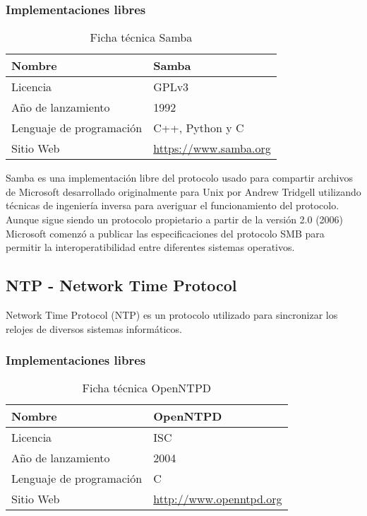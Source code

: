 \subsubsection {Implementaciones libres}

\begin{table}[H]
\begin{tabular}{|l|l|}
\hline
Nombre                   & Samba                        \\ \hline
Licencia                 & GPLv3                        \\ \hline
Año de lanzamiento       & 1992                         \\ \hline
Lenguaje de programación & C++, Python y C              \\ \hline
Sitio Web                & \url{https://www.samba.org} 	\\ \hline
\end{tabular}
\caption{Ficha técnica Samba}
\end{table}

Samba es una implementación libre del protocolo usado para compartir archivos de Microsoft desarrollado originalmente para Unix por Andrew Tridgell utilizando técnicas de ingeniería inversa para averiguar el funcionamiento del protocolo. Aunque sigue siendo un protocolo propietario a partir de la versión 2.0 (2006) Microsoft comenzó a publicar las especificaciones del protocolo SMB para permitir la interoperatibilidad entre diferentes sistemas operativos.


\subsection {NTP - Network Time Protocol}

Network Time Protocol (NTP) es un protocolo utilizado para sincronizar los relojes de diversos sistemas informáticos.

\subsubsection {Implementaciones libres}

\begin{table}[H]
\begin{tabular}{|l|l|}
\hline
Nombre                   & OpenNTPD                       \\ \hline
Licencia                 & ISC                            \\ \hline
Año de lanzamiento       & 2004                           \\ \hline
Lenguaje de programación & C                              \\ \hline
Sitio Web                & \url{http://www.openntpd.org}  \\ \hline
\end{tabular}
\caption{Ficha técnica OpenNTPD}
\end{table}

